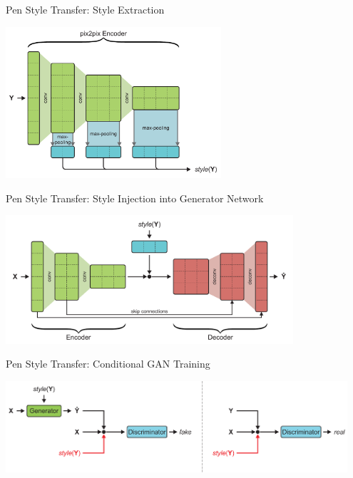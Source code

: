 \documentclass[aspectratio=169]{beamer}
\begin{document}
\begin{frame}{Pen Style Transfer: Style Extraction}
\begin{center}
\includegraphics[width=0.60\textwidth]{../thesis/assets/pen_style_transfer/styleExtraction.pdf}
\end{center}  
\end{frame}



\begin{frame}{Pen Style Transfer: Style Injection into Generator Network}
\begin{center}
\includegraphics[width=0.80\textwidth]{../thesis/assets/pen_style_transfer/modifiedPix2Pix.pdf}
\end{center}  
\end{frame}



\begin{frame}{Pen Style Transfer: Conditional GAN Training}
\begin{center}
\includegraphics[width=0.95\textwidth]{assets/modifiedPix2PixTraining.pdf}
\end{center}  
\end{frame}
\end{document}

